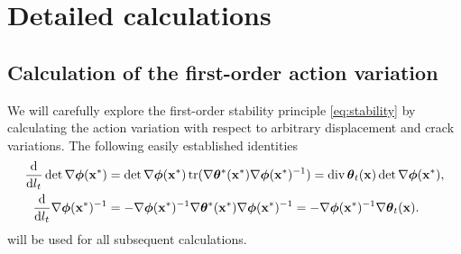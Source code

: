 \appendix
\chapter{Detailed calculations}

\section{Calculation of the first-order action variation} \label{sec:calactionvariation}
We will carefully explore the first-order stability principle \eqref{eq:stability} by calculating the action variation with respect to arbitrary displacement and crack variations. The following easily established identities
\begin{align*}
\frac{\md}{\md l_t}\det\nabla\philt(\vec{x}^*) &= \det\nabla\philt(\vec{x}^*)\tr(\nabla\vtheta^*(\vec{x}^*)\nabla\philt(\vec{x}^*)^{-1})=\div\vtheta_t(\vec{x})\det\nabla\philt(\vec{x}^*), \\
\frac{\md}{\md l_t}\nabla\philt(\vec{x}^*)^{-1} &= -\nabla\philt(\vec{x}^*)^{-1}\nabla\vtheta^*(\vec{x}^*)\nabla\philt(\vec{x}^*)^{-1}=-\nabla\philt(\vec{x}^*)^{-1}\nabla\vtheta_t(\vec{x}).
\end{align*}
will be used for all subsequent calculations.

